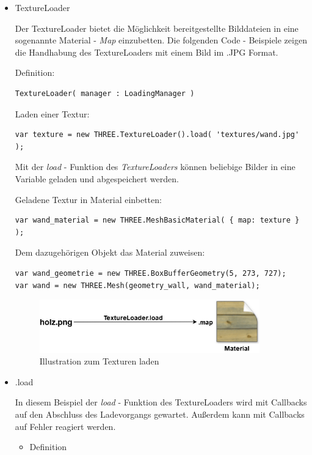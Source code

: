 \begin{itemize}
    \item TextureLoader 
  
 Der TextureLoader bietet die Möglichkeit bereitgestellte Bilddateien in eine sogenannte Material - \textit{Map} einzubetten. Die folgenden Code - Beispiele zeigen die Handhabung des TextureLoaders mit einem Bild im .JPG Format. \cite{TextureLoader}
 
Definition:
\begin{lstlisting}
TextureLoader( manager : LoadingManager )
\end{lstlisting}

Laden einer Textur: 
\begin{lstlisting}
var texture = new THREE.TextureLoader().load( 'textures/wand.jpg' );
\end{lstlisting}
Mit der \textit{load} - Funktion des \textit{TextureLoaders} können beliebige Bilder in eine Variable geladen und abgespeichert werden.

Geladene Textur in Material einbetten:
\begin{lstlisting}
var wand_material = new THREE.MeshBasicMaterial( { map: texture } );
\end{lstlisting}

Dem dazugehörigen Objekt das Material zuweisen:
\begin{lstlisting}
var wand_geometrie = new THREE.BoxBufferGeometry(5, 273, 727);
var wand = new THREE.Mesh(geometry_wall, wand_material);
\end{lstlisting}

\begin{figure}[h]
    \centering
    \includegraphics[width=0.9\textwidth]{images/textures.png}
    \caption{Illustration zum Texturen laden}
    \label{fig:my_label}
\end{figure}
\newpage
\item .load

In diesem Beispiel der \textit{load} - Funktion des TextureLoaders wird mit Callbacks auf den Abschluss des Ladevorgangs gewartet. Außerdem kann mit Callbacks auf Fehler reagiert werden. 

\begin{itemize}
    \item Definition 


\end{itemize}
\end{itemize}
